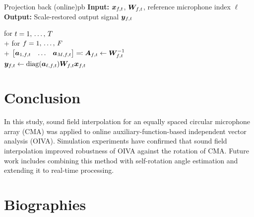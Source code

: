 \documentclass[sip,biber]{now-journal}
\begin{document}
\begin{algorithm}{Projection back (online)}{pb}
  \textbf{Input:} $\Obs _{\ft}$, $\Demix _{\ft}$, reference microphone index $\ell$\\
  \textbf{Output:} Scale-restored output signal $\Est _{\ft}$
  \begin{pseudo}
    for $t = 1,\, \dots,\, T$ \\+
      for $f = 1,\, \dots,\, F$ \\+
        $\begin{bmatrix} \steer _{1,\ft} & \dots & \steer _{\Mic,\ft} \end{bmatrix} \eqqcolon \Steer _{\ft} \gets \Demix _{\ft} ^{-1}$ \\
        $\Est _{\ft} \gets \mathrm{diag}(\steer _{\ell,\ft}) \Demix _{\ft} \Obs _{\ft}$
  \end{pseudo}
\end{algorithm}

\section{Conclusion}
In this study, sound field interpolation for an equally spaced circular microphone array (CMA) was applied to online auxiliary-function-based independent vector analysis (OIVA).
Simulation experiments have confirmed that sound field interpolation improved robustness of OIVA against the rotation of CMA.
Future work includes combining this method with self-rotation angle estimation \cite{Lian:2021:APSIPA} and extending it to real-time processing.

\section*{Biographies}
\end{document}
